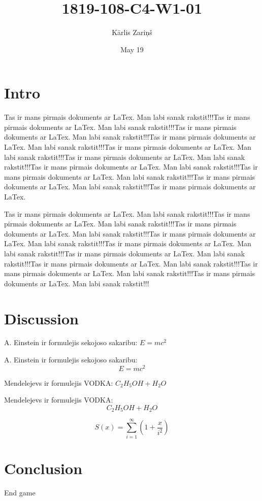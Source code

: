 \documentclass{report}
\title{1819-108-C4-W1-01}
\author{Kārlis Zariņš}
\date{May 19}
\begin{document}
\maketitle

\section*{Intro}

Tas ir mans pirmais dokuments ar LaTex. Man labi sanak rakstit!!!Tas ir mans pirmais dokuments ar LaTex. Man labi sanak rakstit!!!Tas ir mans pirmais dokuments ar LaTex. Man labi sanak rakstit!!!Tas ir mans pirmais dokuments ar LaTex. Man labi sanak rakstit!!!Tas ir mans pirmais dokuments ar LaTex. Man labi sanak rakstit!!!Tas ir mans pirmais dokuments ar LaTex. Man labi sanak rakstit!!!Tas ir mans pirmais dokuments ar LaTex. Man labi sanak rakstit!!!Tas ir mans pirmais dokuments ar LaTex. Man labi sanak rakstit!!!Tas ir mans pirmais dokuments ar LaTex. Man labi sanak rakstit!!!Tas ir mans pirmais dokuments ar LaTex. 

Tas ir mans pirmais dokuments ar LaTex. Man labi sanak rakstit!!!Tas ir mans pirmais dokuments ar LaTex. Man labi sanak rakstit!!!Tas ir mans pirmais dokuments ar LaTex. Man labi sanak rakstit!!!Tas ir mans pirmais dokuments ar LaTex. Man labi sanak rakstit!!!Tas ir mans pirmais dokuments ar LaTex. Man labi sanak rakstit!!!Tas ir mans pirmais dokuments ar LaTex. Man labi sanak rakstit!!!Tas ir mans pirmais dokuments ar LaTex. Man labi sanak rakstit!!!Tas ir mans pirmais dokuments ar LaTex. Man labi sanak rakstit!!!Tas ir mans pirmais dokuments ar LaTex. Man labi sanak rakstit!!!

\section{Discussion}

A. Einstein ir formulejis sekojoso sakaribu: $E=mc^2$

A. Einstein ir formulejis sekojoso sakaribu: $$E=mc^2$$

Mendelejevs ir formulejis VODKA: $C_2H_5OH+ H_2O$

Mendelejevs ir formulejis VODKA:$$C_2H_5OH+ H_2O$$

$$S(x)=\sum_{i=1}^\infty(1+\frac{x}{i^2})$$


\section{Conclusion}
End game
\end{document}

